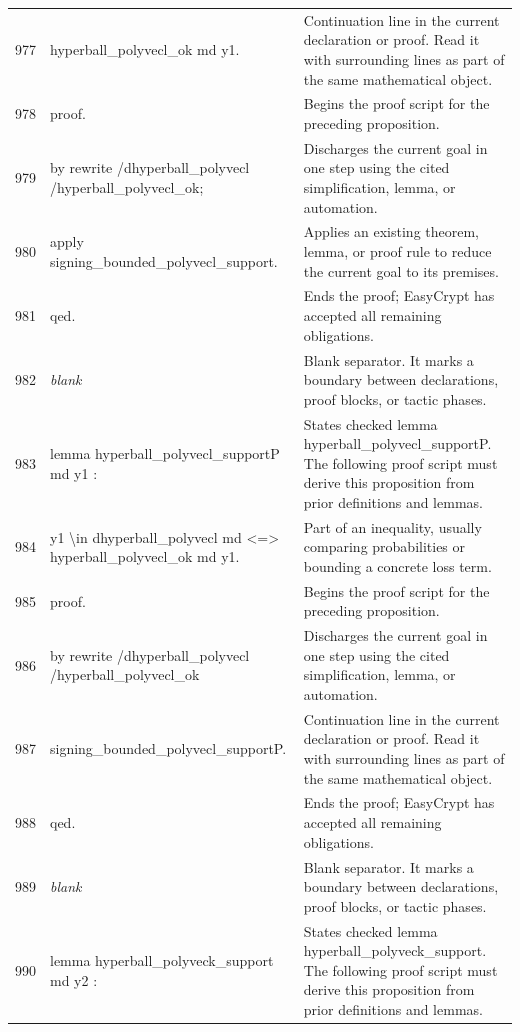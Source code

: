 \documentclass[10pt]{article}
\begin{document}
\begin{longtable}{r L{0.53\textwidth} L{0.37\textwidth}}
977 & {\ttfamily\scriptsize   hyperball\_polyvecl\_ok md y1.} & Continuation line in the current declaration or proof.  Read it with surrounding lines as part of the same mathematical object. \\
978 & {\ttfamily\scriptsize proof.} & Begins the proof script for the preceding proposition. \\
979 & {\ttfamily\scriptsize by rewrite /dhyperball\_polyvecl /hyperball\_polyvecl\_ok;} & Discharges the current goal in one step using the cited simplification, lemma, or automation. \\
980 & {\ttfamily\scriptsize    apply signing\_bounded\_polyvecl\_support.} & Applies an existing theorem, lemma, or proof rule to reduce the current goal to its premises. \\
981 & {\ttfamily\scriptsize qed.} & Ends the proof; EasyCrypt has accepted all remaining obligations. \\
982 & {\ttfamily\scriptsize \emph{blank}} & Blank separator.  It marks a boundary between declarations, proof blocks, or tactic phases. \\
983 & {\ttfamily\scriptsize lemma hyperball\_polyvecl\_supportP md y1 :} & States checked lemma hyperball\_polyvecl\_supportP.  The following proof script must derive this proposition from prior definitions and lemmas. \\
984 & {\ttfamily\scriptsize   y1 \textbackslash{}in dhyperball\_polyvecl md <=> hyperball\_polyvecl\_ok md y1.} & Part of an inequality, usually comparing probabilities or bounding a concrete loss term. \\
985 & {\ttfamily\scriptsize proof.} & Begins the proof script for the preceding proposition. \\
986 & {\ttfamily\scriptsize by rewrite /dhyperball\_polyvecl /hyperball\_polyvecl\_ok} & Discharges the current goal in one step using the cited simplification, lemma, or automation. \\
987 & {\ttfamily\scriptsize            signing\_bounded\_polyvecl\_supportP.} & Continuation line in the current declaration or proof.  Read it with surrounding lines as part of the same mathematical object. \\
988 & {\ttfamily\scriptsize qed.} & Ends the proof; EasyCrypt has accepted all remaining obligations. \\
989 & {\ttfamily\scriptsize \emph{blank}} & Blank separator.  It marks a boundary between declarations, proof blocks, or tactic phases. \\
990 & {\ttfamily\scriptsize lemma hyperball\_polyveck\_support md y2 :} & States checked lemma hyperball\_polyveck\_support.  The following proof script must derive this proposition from prior definitions and lemmas. \\

\end{longtable}
\end{document}
